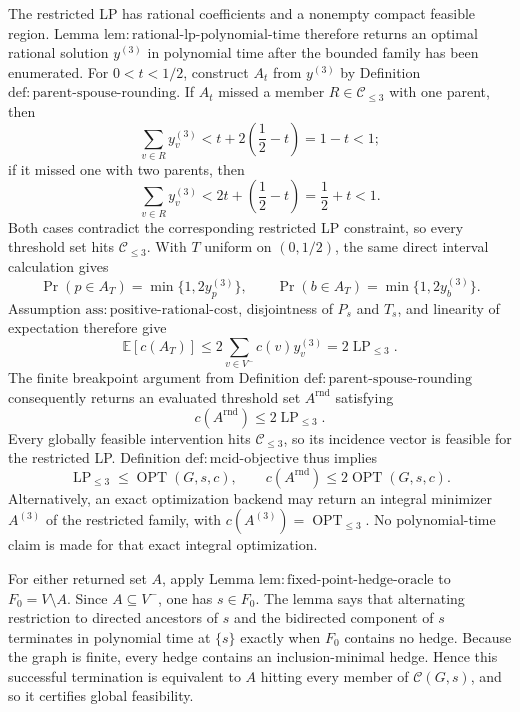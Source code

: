 The restricted LP has rational coefficients and a nonempty compact feasible region.  Lemma \(\mathrm{lem{:}rational\mbox{-}lp\mbox{-}polynomial\mbox{-}time}\) therefore returns an optimal rational solution \(y^{(3)}\) in polynomial time after the bounded family has been enumerated.  For \(0<t<1/2\), construct \(A_t\) from \(y^{(3)}\) by Definition \(\mathrm{def{:}parent\mbox{-}spouse\mbox{-}rounding}\).  If \(A_t\) missed a member \(R\in\mathcal C_{\leq3}\) with one parent, then
\[
 \sum_{v\in R}y^{(3)}_v
 <t+2\left(\frac12-t\right)=1-t<1;
\]
if it missed one with two parents, then
\[
 \sum_{v\in R}y^{(3)}_v
 <2t+\left(\frac12-t\right)=\frac12+t<1.
\]
Both cases contradict the corresponding restricted LP constraint, so every threshold set hits \(\mathcal C_{\leq3}\).  With \(T\) uniform on \((0,1/2)\), the same direct interval calculation gives
\[
 \Pr(p\in A_T)=\min\{1,2y^{(3)}_p\},
 \qquad
 \Pr(b\in A_T)=\min\{1,2y^{(3)}_b\}.
\]
Assumption \(\mathrm{ass{:}positive\mbox{-}rational\mbox{-}cost}\), disjointness of \(P_s\) and \(T_s\), and linearity of expectation therefore give
\[
 \mathbb E[c(A_T)]
 \leq2\sum_{v\in V^{-}}c(v)y^{(3)}_v
 =2\operatorname{LP}_{\leq3}.
\]
The finite breakpoint argument from Definition \(\mathrm{def{:}parent\mbox{-}spouse\mbox{-}rounding}\) consequently returns an evaluated threshold set \(A^{\mathrm{rnd}}\) satisfying
\[
 c(A^{\mathrm{rnd}})\leq2\operatorname{LP}_{\leq3}.
\]
Every globally feasible intervention hits \(\mathcal C_{\leq3}\), so its incidence vector is feasible for the restricted LP.  Definition \(\mathrm{def{:}mcid\mbox{-}objective}\) thus implies
\[
 \operatorname{LP}_{\leq3}\leq\operatorname{OPT}(G,s,c),
 \qquad
 c(A^{\mathrm{rnd}})\leq2\operatorname{OPT}(G,s,c).
\]
Alternatively, an exact optimization backend may return an integral minimizer \(A^{(3)}\) of the restricted family, with \(c(A^{(3)})=\operatorname{OPT}_{\leq3}\).  No polynomial-time claim is made for that exact integral optimization.

For either returned set \(A\), apply Lemma \(\mathrm{lem{:}fixed\mbox{-}point\mbox{-}hedge\mbox{-}oracle}\) to \(F_0=V\setminus A\).  Since \(A\subseteq V^{-}\), one has \(s\in F_0\).  The lemma says that alternating restriction to directed ancestors of \(s\) and the bidirected component of \(s\) terminates in polynomial time at \(\{s\}\) exactly when \(F_0\) contains no hedge.  Because the graph is finite, every hedge contains an inclusion-minimal hedge.  Hence this successful termination is equivalent to \(A\) hitting every member of \(\mathcal C(G,s)\), and so it certifies global feasibility.

